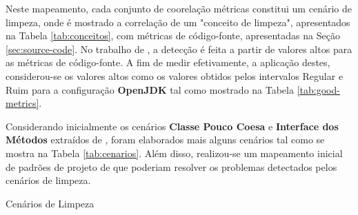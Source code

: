 Neste mapeamento, cada conjunto de coorelação métricas constitui um cenário de limpeza, onde é mostrado a correlação de um "conceito de limpeza", apresentados na Tabela \ref{tab:conceitos}, com métricas de código-fonte, apresentadas na Seção \ref{sec:source-code}. No trabalho de , a detecção é feita a partir de valores altos para as métricas de código-fonte.  A fim de medir efetivamente, a aplicação destes, considerou-se os valores altos como os valores obtidos pelos intervalos Regular e Ruim para a configuração \textbf{OpenJDK} tal como mostrado na Tabela \ref{tab:good-metrics}.  

Considerando inicialmente os cenários \textbf{Classe Pouco Coesa} e \textbf{Interface dos Métodos} extraídos de , foram elaborados mais alguns cenários tal como se mostra na Tabela \ref{tab:cenarios}. Além disso, realizou-se um mapeamento inicial de padrões de projeto de  que poderiam resolver os problemas detectados pelos cenários de limpeza. 

\begin{table}
\begin{table}[H]
\centering

\caption{Cenários de Limpeza}
\label{tab:cenarios}
\end{table}
\FloatBarrier
\end{table}

